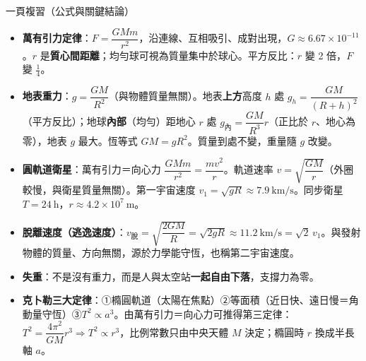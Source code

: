 \documentclass[11pt]{article}
\begin{document}
\begin{補充框}{一頁複習（公式與關鍵結論）}
\begin{itemize}\setlength{\itemsep}{2pt}
\item \textbf{萬有引力定律}：$F=\dfrac{GMm}{r^2}$，沿連線、互相吸引、成對出現，$G\approx6.67\times10^{-11}$。$r$ 是\textbf{質心間距離}；均勻球可視為質量集中於球心。平方反比：$r$ 變 2 倍，$F$ 變 $\tfrac14$。
\item \textbf{地表重力}：$g=\dfrac{GM}{R^2}$（與物體質量無關）。地表\textbf{上方}高度 $h$ 處 $g_h=\dfrac{GM}{(R+h)^2}$（平方反比）；地球\textbf{內部}（均勻）距地心 $r$ 處 $g_{\text{內}}=\dfrac{GM}{R^3}r$（正比於 $r$、地心為零），地表 $g$ 最大。恆等式 $GM=gR^2$。質量到處不變，重量隨 $g$ 改變。
\item \textbf{圓軌道衛星}：萬有引力＝向心力 $\dfrac{GMm}{r^2}=\dfrac{mv^2}{r}$。軌道速率 $v=\sqrt{\dfrac{GM}{r}}$（外圈較慢，與衛星質量無關）。第一宇宙速度 $v_1=\sqrt{gR}\approx7.9\ \text{km/s}$。同步衛星 $T=24\ \text{h}$，$r\approx4.2\times10^7\ \text{m}$。
\item \textbf{脫離速度（逃逸速度）}：$v_{\text{脫}}=\sqrt{\dfrac{2GM}{R}}=\sqrt{2gR}\approx11.2\ \text{km/s}=\sqrt2\,v_1$。與發射物體的質量、方向無關，源於力學能守恆，也稱第二宇宙速度。
\item \textbf{失重}：不是沒有重力，而是人與太空站\textbf{一起自由下落}，支撐力為零。
\item \textbf{克卜勒三大定律}：①橢圓軌道（太陽在焦點）②等面積（近日快、遠日慢＝角動量守恆）③$T^2\propto a^3$。由萬有引力＝向心力可推得第三定律：$T^2=\dfrac{4\pi^2}{GM}r^3\Rightarrow T^2\propto r^3$，比例常數只由中央天體 $M$ 決定；橢圓時 $r$ 換成半長軸 $a$。
\end{itemize}
\end{補充框}
\end{document}
